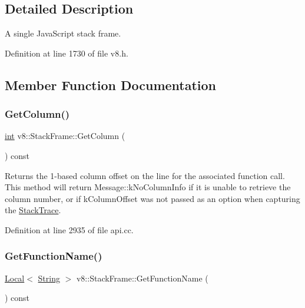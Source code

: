 \subsection{Detailed Description}
A single Java\+Script stack frame. 

Definition at line 1730 of file v8.\+h.



\subsection{Member Function Documentation}
\mbox{\label{classv8_1_1StackFrame_a3b4d7d29ae82b88304d09ea5c5e43db1}} 
\subsubsection{\texorpdfstring{Get\+Column()}{GetColumn()}}
{\footnotesize\ttfamily \mbox{\hyperlink{classint}{int}} v8\+::\+Stack\+Frame\+::\+Get\+Column (\begin{DoxyParamCaption}{ }\end{DoxyParamCaption}) const}

Returns the 1-\/based column offset on the line for the associated function call. This method will return Message\+::k\+No\+Column\+Info if it is unable to retrieve the column number, or if k\+Column\+Offset was not passed as an option when capturing the \mbox{\hyperlink{classv8_1_1StackTrace}{Stack\+Trace}}. 

Definition at line 2935 of file api.\+cc.

\mbox{\label{classv8_1_1StackFrame_ab382d964b5c4b55c5886c7d86398556f}} 
\subsubsection{\texorpdfstring{Get\+Function\+Name()}{GetFunctionName()}}
{\footnotesize\ttfamily \mbox{\hyperlink{classv8_1_1Local}{Local}}$<$ \mbox{\hyperlink{classv8_1_1String}{String}} $>$ v8\+::\+Stack\+Frame\+::\+Get\+Function\+Name (\begin{DoxyParamCaption}{ }\end{DoxyParamCaption}) const}

